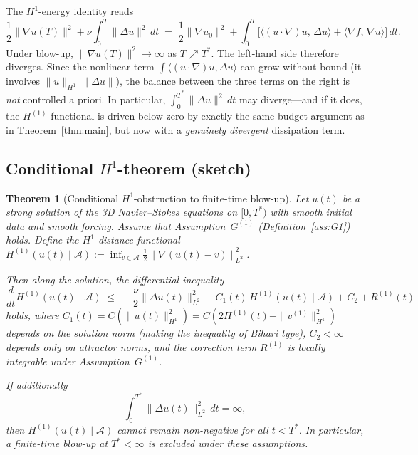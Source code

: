 \documentclass[12pt,a4paper]{article}
\theoremstyle{definition}
\theoremstyle{plain}
\newtheorem{theorem}[definition]{Theorem}
\theoremstyle{remark}
\begin{document}
The $H^1$-energy identity reads
\begin{equation}\label{eq:H1-energy-id}
  \frac{1}{2}\|\nabla u(T)\|^2 + \nu\int_0^T\|\Delta u\|^2\,dt
  \;=\;
  \frac{1}{2}\|\nabla u_0\|^2
  + \int_0^T\!\bigl[\langle (u\cdot\nabla)u,\,\Delta u\rangle
  + \langle \nabla f,\, \nabla u\rangle\bigr]\,dt.
\end{equation}
Under blow-up, $\|\nabla u(T)\|^2 \to \infty$ as $T \nearrow T^*$.
The left-hand side therefore diverges.  Since the nonlinear term
$\int\langle (u\cdot\nabla)u, \Delta u\rangle$ can grow without
bound (it involves $\|u\|_{H^1}\,\|\Delta u\|$), the balance
between the three terms on the right is \emph{not} controlled
a priori.  In particular, $\int_0^{T^*}\|\Delta u\|^2\,dt$ may
diverge---and if it does, the $H^{(1)}$-functional is driven below
zero by exactly the same budget argument as in Theorem~\ref{thm:main},
but now with a \emph{genuinely divergent} dissipation term.

\subsection{Conditional $H^1$-theorem (sketch)}

\begin{theorem}[Conditional $H^1$-obstruction to finite-time blow-up]
\label{thm:H1-main}
Let $u(t)$ be a strong solution of the 3D Navier--Stokes equations on
$[0,T^*)$ with smooth initial data and smooth forcing.  Assume that
Assumption~$G^{(1)}$ (Definition~\ref{ass:G1}) holds.  Define the
$H^1$-distance functional
$H^{(1)}(u(t) \mid \mathcal{A})
:= \inf_{v \in \mathcal{A}} \tfrac{1}{2}\|\nabla(u(t)-v)\|_{L^2}^2$.

Then along the solution, the differential inequality
\begin{equation}\label{eq:H1-diff}
  \frac{d}{dt}H^{(1)}(u(t) \mid \mathcal{A})
  \;\le\;
  -\frac{\nu}{2}\|\Delta u(t)\|_{L^2}^2
  + C_1(t)\,H^{(1)}(u(t) \mid \mathcal{A})
  + C_2
  + R^{(1)}(t)
\end{equation}
holds, where $C_1(t) = C(\|u(t)\|_{H^1}^2) = C(2H^{(1)}(t)
+ \|v^{(1)}\|_{H^1}^2)$ depends on the solution norm (making the
inequality of Bihari type), $C_2 < \infty$ depends only on
attractor norms,
and the correction term $R^{(1)}$ is locally integrable under
Assumption~$G^{(1)}$.

If additionally
\begin{equation}\label{eq:enstr-diss-div}
  \int_0^{T^*}\|\Delta u(t)\|_{L^2}^2\,dt = \infty,
\end{equation}
then $H^{(1)}(u(t) \mid \mathcal{A})$ cannot remain non-negative
for all $t < T^*$.  In particular, a finite-time blow-up at
$T^* < \infty$ is excluded under these assumptions.
\end{theorem}
\end{document}
